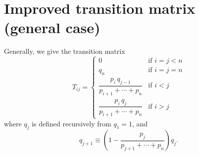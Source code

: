 \documentclass[12pt]{article}
\begin{document}
\section{Improved transition matrix (general case)}

Generally, we give the transition matrix
$$
T_{ij} =
\begin{cases}
  0 & \mbox{if $i = j < n$} \\
  q_n & \mbox{if $i = j = n$} \\
  \dfrac{p_i \, q_{j-1}}{p_{i+1} + \cdots + p_n} & \mbox{if $i < j$} \\
  \dfrac{p_i \, q_j}{p_{i+1} + \cdots + p_n} & \mbox{if $i > j$}
\end{cases}
$$
where $q_j$ is defined recursively from $q_1 = 1$, and
$$
q_{j+1} \equiv \left(1 - \frac{ p_j } { p_{j+1} + \cdots + p_n }\right) q_j.
$$
\end{document}
